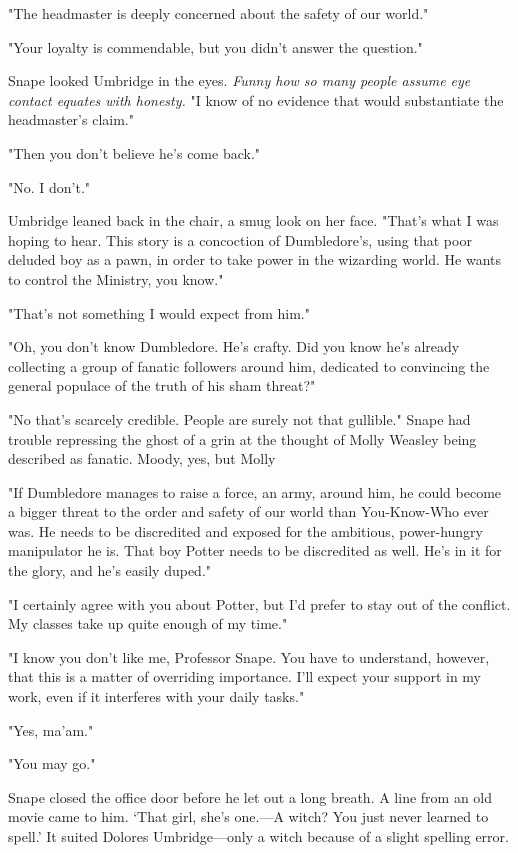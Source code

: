 "The headmaster is deeply concerned about the safety of our world."

"Your loyalty is commendable, but you didn't answer the question."

Snape looked Umbridge in the eyes. \emph{Funny how so many people assume eye contact equates with honesty.} "I know of no evidence that would substantiate the headmaster's claim."

"Then you don't believe he's come back."

"No. I don't."

Umbridge leaned back in the chair, a smug look on her face. "That's what I was hoping to hear. This story is a concoction of Dumbledore's, using that poor deluded boy as a pawn, in order to take power in the wizarding world. He wants to control the Ministry, you know."

"That's not something I would expect from him."

"Oh, you don't know Dumbledore. He's crafty. Did you know he's already collecting a group of fanatic followers around him, dedicated to convincing the general populace of the truth of his sham threat?"

"No{\el} that's scarcely credible. People are surely not that gullible." Snape had trouble repressing the ghost of a grin at the thought of Molly Weasley being described as fanatic. Moody, yes, but Molly{\el}

"If Dumbledore manages to raise a force, an army, around him, he could become a bigger threat to the order and safety of our world than You-Know-Who ever was. He needs to be discredited and exposed for the ambitious, power-hungry manipulator he is. That boy Potter needs to be discredited as well. He's in it for the glory, and he's easily duped."

"I certainly agree with you about Potter, but I'd prefer to stay out of the conflict. My classes take up quite enough of my time."

"I know you don't like me, Professor Snape. You have to understand, however, that this is a matter of overriding importance. I'll expect your support in my work, even if it interferes with your daily tasks."

"Yes, ma'am."

"You may go."

Snape closed the office door before he let out a long breath. A line from an old movie came to him. `That girl, she's one.—A witch? You just never learned to spell.' It suited Dolores Umbridge—only a witch because of a slight spelling error.

